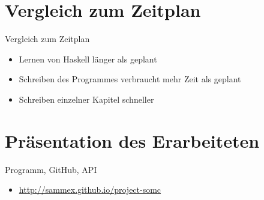 \documentclass{beamer}
\begin{document}
\section{Vergleich zum Zeitplan}

\begin{frame}{Vergleich zum Zeitplan}
\begin{itemize}[<+->]
\item Lernen von Haskell länger als geplant
\item Schreiben des Programmes verbraucht mehr Zeit als geplant
\item Schreiben einzelner Kapitel schneller
\end{itemize}
\end{frame}

\section{Präsentation des Erarbeiteten}

\begin{frame}{Programm, GitHub, API}
\begin{itemize}
\item \url{http://sammex.github.io/project-somc}
\end{itemize}
\end{frame}
\end{document}
